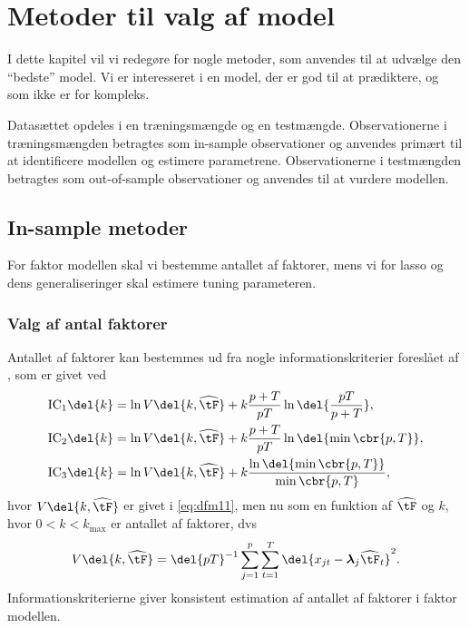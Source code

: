 \chapter{Metoder til valg af model} \label{ch:metoder}
I dette kapitel vil vi redegøre for nogle metoder, som anvendes til at udvælge den ``bedste'' model. 
Vi er interesseret i en model, der er god til at prædiktere, og som ikke er for kompleks.

Datasættet opdeles i en træningsmængde og en testmængde. 
Observationerne i træningsmængden betragtes som in-sample observationer og anvendes primært til at identificere modellen og estimere parametrene. 
Observationerne i testmængden betragtes som out-of-sample observationer og anvendes til at vurdere modellen. 
 
\section{In-sample metoder}
For faktor modellen skal vi bestemme antallet af faktorer, mens vi for lasso og dens generaliseringer skal estimere tuning parameteren.

\subsection{Valg af antal faktorer} \label{sec:faktorer}
Antallet af faktorer kan bestemmes ud fra nogle informationskriterier foreslået af \citep{Bai_Ng}, som er givet ved
\begin{align}
\text{IC}_1 \del{k} &= \ln V \del{k, \widehat{\tF}} + k \frac{p + T}{p T} \ln \del{\frac{p T}{p + T}}, \label{eq:ic1} \\
\text{IC}_2 \del{k} &= \ln V \del{k, \widehat{\tF}} + k \frac{p + T}{p T} \ln \del{ \min \cbr{p, T}}, \label{eq:ic2} \\
\text{IC}_3 \del{k} &= \ln V \del{k, \widehat{\tF}} + k \frac{\ln \del{\min \cbr{p, T}}}{\min \cbr{p, T}}, \label{eq:ic3}
\end{align}
hvor \(V \del{k, \widehat{\tF}}\) er givet i \eqref{eq:dfm11}, men nu som en funktion af \(\widehat{\tF}\) og \(k\), hvor \(0<k<k_\text{max}\) er antallet af faktorer, dvs
\begin{align*}
V \del{k, \widehat{\tF}} = \del{p T}^{-1} \sum_{j=1}^p \sum_{t=1}^{T} \del{x_{jt} -\boldsymbol{\lambda}_j \widehat{\tF}_t}^2.
\end{align*}
Informationskriterierne giver konsistent estimation af antallet af faktorer i faktor modellen.

